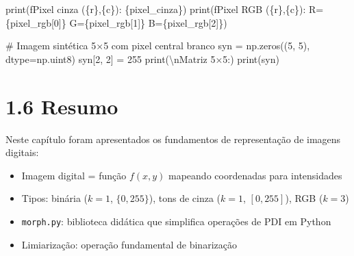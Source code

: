 \documentclass[
  portuguese,
  letterpaper,
  openany,
  oneside,
  12pt,
  a4paper]{book}
\newenvironment{Shaded}{\begin{snugshade}}{\end{snugshade}}
\newcommand{\BuiltInTok}[1]{\textcolor[rgb]{0.00,0.23,0.31}{#1}}
\newcommand{\CharTok}[1]{\textcolor[rgb]{0.13,0.47,0.30}{#1}}
\newcommand{\CommentTok}[1]{\textcolor[rgb]{0.37,0.37,0.37}{#1}}
\newcommand{\DecValTok}[1]{\textcolor[rgb]{0.68,0.00,0.00}{#1}}
\newcommand{\NormalTok}[1]{\textcolor[rgb]{0.00,0.23,0.31}{#1}}
\newcommand{\OperatorTok}[1]{\textcolor[rgb]{0.37,0.37,0.37}{#1}}
\newcommand{\SpecialCharTok}[1]{\textcolor[rgb]{0.37,0.37,0.37}{#1}}
\newcommand{\SpecialStringTok}[1]{\textcolor[rgb]{0.13,0.47,0.30}{#1}}
\newcommand{\StringTok}[1]{\textcolor[rgb]{0.13,0.47,0.30}{#1}}
\providecommand{\tightlist}{%
  \setlength{\itemsep}{0pt}\setlength{\parskip}{0pt}}
\begin{document}
\begin{tcolorbox}
\begin{Shaded}
\begin{Highlighting}[]
\BuiltInTok{print}\NormalTok{(}\SpecialStringTok{f\textquotesingle{}Pixel cinza (}\SpecialCharTok{\{}\NormalTok{r}\SpecialCharTok{\}}\SpecialStringTok{,}\SpecialCharTok{\{}\NormalTok{c}\SpecialCharTok{\}}\SpecialStringTok{): }\SpecialCharTok{\{}\NormalTok{pixel\_cinza}\SpecialCharTok{\}}\SpecialStringTok{\textquotesingle{}}\NormalTok{)}
\BuiltInTok{print}\NormalTok{(}\SpecialStringTok{f\textquotesingle{}Pixel RGB   (}\SpecialCharTok{\{}\NormalTok{r}\SpecialCharTok{\}}\SpecialStringTok{,}\SpecialCharTok{\{}\NormalTok{c}\SpecialCharTok{\}}\SpecialStringTok{): R=}\SpecialCharTok{\{}\NormalTok{pixel\_rgb[}\DecValTok{0}\NormalTok{]}\SpecialCharTok{\}}\SpecialStringTok{  G=}\SpecialCharTok{\{}\NormalTok{pixel\_rgb[}\DecValTok{1}\NormalTok{]}\SpecialCharTok{\}}\SpecialStringTok{  B=}\SpecialCharTok{\{}\NormalTok{pixel\_rgb[}\DecValTok{2}\NormalTok{]}\SpecialCharTok{\}}\SpecialStringTok{\textquotesingle{}}\NormalTok{)}

\CommentTok{\# Imagem sintética 5×5 com pixel central branco}
\NormalTok{syn }\OperatorTok{=}\NormalTok{ np.zeros((}\DecValTok{5}\NormalTok{, }\DecValTok{5}\NormalTok{), dtype}\OperatorTok{=}\NormalTok{np.uint8)}
\NormalTok{syn[}\DecValTok{2}\NormalTok{, }\DecValTok{2}\NormalTok{] }\OperatorTok{=} \DecValTok{255}
\BuiltInTok{print}\NormalTok{(}\StringTok{\textquotesingle{}}\CharTok{\textbackslash{}n}\StringTok{Matriz 5×5:\textquotesingle{}}\NormalTok{)}
\BuiltInTok{print}\NormalTok{(syn)}
\end{Highlighting}
\end{Shaded}

\section{1.6 Resumo}\label{resumo-2}

Neste capítulo foram apresentados os fundamentos de representação de
imagens digitais:

\begin{itemize}
\tightlist
\item
  Imagem digital = função \(f(x,y)\) mapeando coordenadas para
  intensidades
\item
  Tipos: binária (\(k=1\), \(\{0,255\}\)), tons de cinza (\(k=1\),
  \([0,255]\)), RGB (\(k=3\))
\item
  \texttt{morph.py}: biblioteca didática que simplifica operações de PDI
  em Python
\item
  Limiarização: operação fundamental de binarização
\end{itemize}


\end{tcolorbox}
\end{document}

